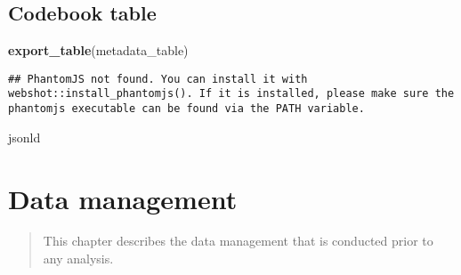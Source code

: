 \documentclass[]{book}
\newenvironment{Shaded}{\begin{snugshade}}{\end{snugshade}}
\newcommand{\KeywordTok}[1]{\textcolor[rgb]{0.13,0.29,0.53}{\textbf{#1}}}
\newcommand{\NormalTok}[1]{#1}
\begin{document}
\section{Codebook table}\label{codebook-table}

\begin{Shaded}
\begin{Highlighting}[]
\KeywordTok{export_table}\NormalTok{(metadata_table)}
\end{Highlighting}
\end{Shaded}

\begin{verbatim}
## PhantomJS not found. You can install it with webshot::install_phantomjs(). If it is installed, please make sure the phantomjs executable can be found via the PATH variable.
\end{verbatim}

\hypertarget{htmlwidget-74fe228e2c8a87a93948}{}

\begin{Shaded}
\begin{Highlighting}[]
\NormalTok{jsonld}
\end{Highlighting}
\end{Shaded}

\chapter{Data management}\label{data-management}

\begin{quote}
This chapter describes the data management that is conducted prior to
any analysis.
\end{quote}
\end{document}
